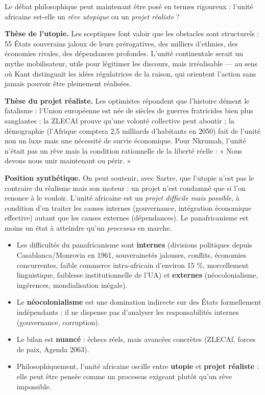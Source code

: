 \documentclass[11pt]{article}
\begin{document}
Le débat philosophique peut maintenant être posé en termes rigoureux : l'unité africaine est-elle un \emph{rêve utopique} ou un \emph{projet réaliste} ?

\textbf{Thèse de l'utopie.} Les sceptiques font valoir que les obstacles sont structurels : 55 États souverains jaloux de leurs prérogatives, des milliers d'ethnies, des économies rivales, des dépendances profondes. L'unité continentale serait un mythe mobilisateur, utile pour légitimer les discours, mais irréalisable — au sens où Kant distinguait les idées régulatrices de la raison, qui orientent l'action sans jamais pouvoir être pleinement réalisées.

\textbf{Thèse du projet réaliste.} Les optimistes répondent que l'histoire dément le fatalisme : l'Union européenne est née de siècles de guerres fratricides bien plus sanglantes ; la ZLECAf prouve qu'une volonté collective peut aboutir ; la démographie (l'Afrique comptera 2,5 milliards d'habitants en 2050) fait de l'unité non un luxe mais une nécessité de survie économique. Pour Nkrumah, l'unité n'était pas un rêve mais la condition rationnelle de la liberté réelle : « Nous devons nous unir maintenant ou périr. »

\textbf{Position synthétique.} On peut soutenir, avec Sartre, que l'utopie n'est pas le contraire du réalisme mais son moteur : un projet n'est condamné que si l'on renonce à le vouloir. L'unité africaine est un \emph{projet difficile mais possible}, à condition d'en traiter les causes internes (gouvernance, intégration économique effective) autant que les causes externes (dépendances). Le panafricanisme est moins un état à atteindre qu'un \emph{processus} en marche.

\begin{aretenir}
\begin{itemize}
\item Les difficultés du panafricanisme sont \textbf{internes} (divisions politiques depuis Casablanca/Monrovia en 1961, souverainetés jalouses, conflits, économies concurrentes, faible commerce intra-africain d'environ 15 \%, morcellement linguistique, faiblesse institutionnelle de l'UA) et \textbf{externes} (néocolonialisme, ingérences, mondialisation inégale).
\item Le \textbf{néocolonialisme} est une domination indirecte sur des États formellement indépendants ; il ne dispense pas d'analyser les responsabilités internes (gouvernance, corruption).
\item Le bilan est \textbf{nuancé} : échecs réels, mais avancées concrètes (ZLECAf, forces de paix, Agenda 2063).
\item Philosophiquement, l'unité africaine oscille entre \textbf{utopie} et \textbf{projet réaliste} : elle peut être pensée comme un processus exigeant plutôt qu'un rêve impossible.
\end{itemize}
\end{aretenir}
\end{document}
